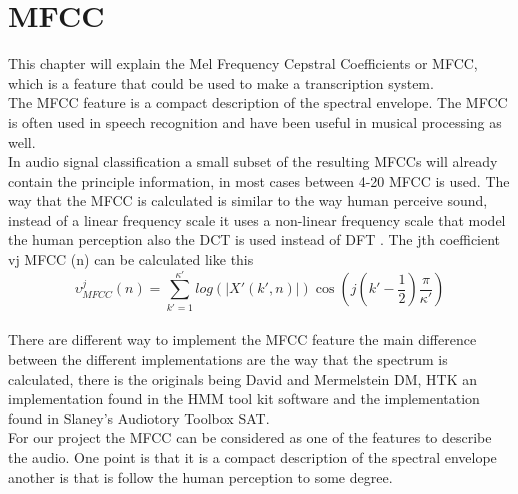 \section{MFCC}
This chapter will explain the Mel Frequency Cepstral Coefficients or MFCC, which is a feature that could be used to make a transcription system. \\
The MFCC feature is a compact description of the spectral envelope. The MFCC is often used in speech recognition and have been useful in musical processing as well\citep{ACA}. \\ 
In audio signal classification a small subset of the resulting MFCCs will already contain the principle information, in most cases between 4-20 MFCC is used. The way that the MFCC is calculated is  similar to the way human perceive sound, instead of a linear frequency scale it uses a non-linear frequency scale that model the human perception also the DCT is used instead of DFT \citep{ACA}. The jth coefficient vj  MFCC (n) can be calculated like this\citep{ACA}\\
\begin{equation}\label{ eq:MFCC calculation}
  \upsilon ^j  _{MFCC} (n) = \sum_{k'=1}^{\kappa'} log(\vert X' (k',n) \vert)\cos(j(k' - \frac{1}{2})\frac{\pi}{\kappa'})
\end{equation}
\\
There are different way to implement the MFCC feature the main difference between the different implementations are the way that the spectrum is calculated, there is the originals being David and Mermelstein DM, HTK an implementation found in the HMM tool kit software and the implementation found in Slaney's Audiotory Toolbox SAT\citep{ACA}.
\\
For our project the MFCC can be considered as one of the features to describe the audio. One point is that it is a compact description of the spectral envelope another is that is follow the human perception to some degree.